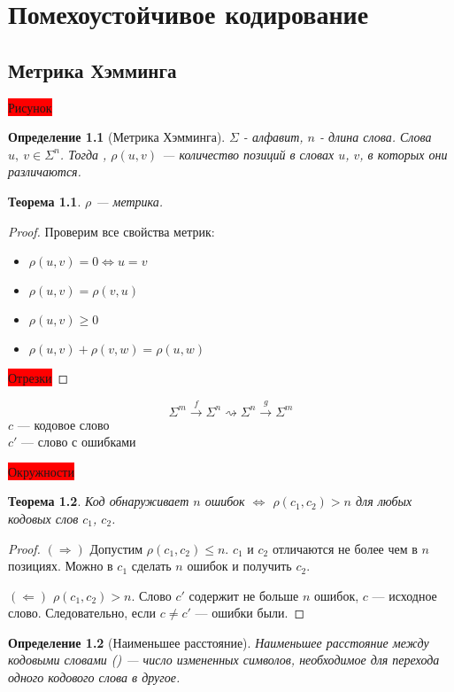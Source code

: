 \documentclass[a4paper,14pt, draft]{report}
\newtheorem{theorem}{Теорема}
\newtheorem{definition}{Определение}
\begin{document}
\chapter{Помехоустойчивое кодирование}
\section{Метрика Хэмминга}
\colorbox{red}{Рисунок}
\begin{definition}[Метрика Хэмминга]
$\Sigma$ - алфавит, $n$ - длина слова. Слова $u,~v\in\Sigma^n$. Тогда , $\rho(u, v)$ --- количество позиций в словах $u$, $v$, в которых они различаются.
\end{definition}
\begin{theorem}$\rho$ --- метрика.
\end{theorem}
\begin{proof}
Проверим все свойства метрик: \begin{itemize}
    \item $\rho(u, v) = 0 \Leftrightarrow u = v$
    \item $\rho(u, v) = \rho(v, u)$
    \item $\rho(u, v) \ge 0$
    \item $\rho(u, v) + \rho(v, w) = \rho(u, w)$
\end{itemize}

\colorbox{red}{Отрезки}
\end{proof}

$$\Sigma^m \xrightarrow{f}\Sigma^n\rightsquigarrow\Sigma^n\xrightarrow{g}\Sigma^m$$
$c$ --- кодовое слово\\$c'$ --- слово с ошибками

\colorbox{red}{Окружности}

\begin{theorem}Код обнаруживает $n$ ошибок $\Leftrightarrow$ $\rho(c_1, c_2) > n$ для любых кодовых слов $c_1$, $c_2$.
\end{theorem}
\begin{proof}$(\Rightarrow)$ Допустим $\rho(c_1, c_2)\le n$. $c_1$ и $c_2$ отличаются не более чем в $n$ позициях. Можно в $c_1$ сделать $n$ ошибок и получить $c_2$.

$(\Leftarrow)$ $\rho(c_1, c_2) > n$. Слово $c'$ содержит не больше $n$ ошибок, $c$ --- исходное слово. Следовательно, если $c \neq c'$ --- ошибки были.
\end{proof}
\begin{definition}[Наименьшее расстояние]
Наименьшее расстояние между кодовыми словами () --- число измененных символов, необходимое для перехода одного кодового слова в другое.
\end{definition}
\end{document}
